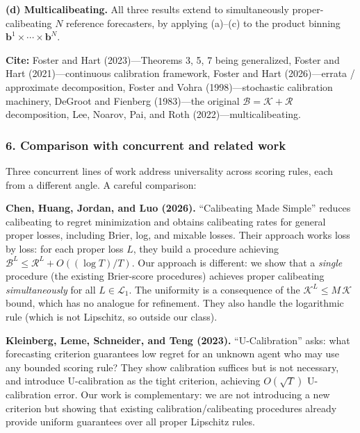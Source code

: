 \medskip\noindent\textbf{(d) Multicalibeating.}
All three results extend to simultaneously proper-calibeating
$N$ reference forecasters, by applying (a)--(c) to the product binning
$\mathbf{b}^{1}\times\cdots\times\mathbf{b}^{N}$.

\medskip\noindent\textbf{Cite:}
Foster and Hart (2023)---Theorems 3, 5, 7 being generalized,
Foster and Hart (2021)---continuous calibration framework,
Foster and Hart (2026)---errata / approximate decomposition,
Foster and Vohra (1998)---stochastic calibration machinery,
DeGroot and Fienberg (1983)---the original $\mathcal{B}=\mathcal{K}+
\mathcal{R}$ decomposition,
Lee, Noarov, Pai, and Roth (2022)---multicalibeating.



\subsubsection*{6. Comparison with concurrent and related work}

Three concurrent lines of work address universality across scoring
rules, each from a different angle.  A careful comparison:

\medskip\noindent\textbf{Chen, Huang, Jordan, and Luo (2026).}
``Calibeating Made Simple'' reduces calibeating to regret minimization
and obtains calibeating rates for general proper losses, including
Brier, log, and mixable losses.  Their approach works loss by loss: for
each proper loss $L$, they build a procedure achieving
$\mathcal{B}^{L} \leq \mathcal{R}^{L} + O((\log T)/T)$.  Our
approach is different: we show that a \emph{single} procedure (the
existing Brier-score procedures) achieves proper calibeating
\emph{simultaneously} for all $L \in \mathcal{L}_{1}$.  The uniformity
is a consequence of the $\mathcal{K}^{L} \leq M\,\mathcal{K}$ bound,
which has no analogue for refinement.  They also handle the logarithmic
rule (which is not Lipschitz, so outside our class).

\medskip\noindent\textbf{Kleinberg, Leme, Schneider, and Teng (2023).}
``U-Calibration'' asks: what forecasting criterion guarantees low regret
for an unknown agent who may use any bounded scoring rule?  They show
calibration suffices but is not necessary, and introduce U-calibration
as the tight criterion, achieving $O(\sqrt{T})$ U-calibration error.
Our work is complementary: we are not introducing a new criterion but
showing that existing calibration/calibeating procedures already provide
uniform guarantees over all proper Lipschitz rules.

